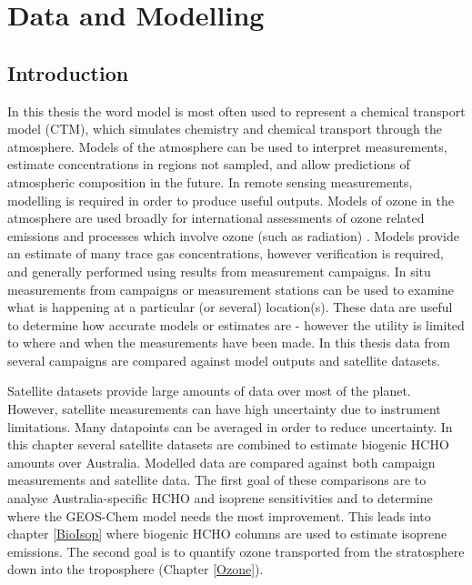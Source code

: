 
\chapter{Data and Modelling} %
\label{Model} %
  
\section{Introduction}
  
  In this thesis the word model is most often used to represent a chemical transport model (CTM), which simulates chemistry and chemical transport through the atmosphere.
  Models of the atmosphere can be used to interpret measurements, estimate concentrations in regions not sampled, and allow predictions of atmospheric composition in the future.
  In remote sensing measurements, modelling is required in order to produce useful outputs.
  Models of ozone in the atmosphere are used broadly for international assessments of ozone related emissions and processes which involve ozone (such as radiation) \parencite{Young2018}.
  Models provide an estimate of many trace gas concentrations, however verification is required, and generally performed using results from measurement campaigns.
  In situ measurements from campaigns or measurement stations can be used to examine what is happening at a particular (or several) location(s).
  These data are useful to determine how accurate models or estimates are - however the utility is limited to where and when the measurements have been made.
  In this thesis data from several campaigns are compared against model outputs and satellite datasets.
  
  Satellite datasets provide large amounts of data over most of the planet.
  However, satellite measurements can have high uncertainty due to instrument limitations.
  Many datapoints can be averaged in order to reduce uncertainty.
  In this chapter several satellite datasets are combined to estimate biogenic HCHO amounts over Australia.
  Modelled data are compared against both campaign measurements and satellite data.
  The first goal of these comparisons are to analyse Australia-specific HCHO and isoprene sensitivities and to determine where the GEOS-Chem model needs the most improvement.
  This leads into chapter \ref{BioIsop} where biogenic HCHO columns are used to estimate isoprene emissions.
  The second goal is to quantify ozone transported from the stratosphere down into the troposphere (Chapter \ref{Ozone}).
  
